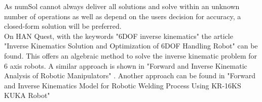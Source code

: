 \medskip

As 
\gls{numSol} 
cannot always deliver all solutions and solve within an unknown number of operations as well as depend on the users decision for accuracy, \cite{invKinSeriallinkMani} a closed-form solution will be preferred.\\

On HAN Quest, with the keywords "6DOF inverse kinematics" the article "Inverse Kinematics Solution and Optimization of 6DOF Handling Robot" \cite{invKinSolYanWu} can be found. This offers an  algebraic method to solve the inverse kinematic problem for 6 axis robots.
A similar approach is shown in "Forward and Inverse Kinematic Analysis of Robotic Manipulators" \cite{FwdInvAnalysRobManip}. Another approach can be found in "Forward and Inverse Kinematics Model for Robotic Welding Process Using KR-16KS KUKA Robot" \cite{FwInvKuka} \\

